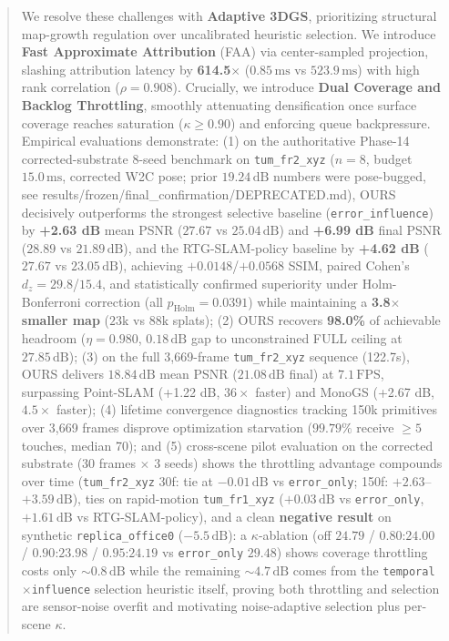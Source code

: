 \documentclass[10pt,twocolumn,letterpaper]{article}
\begin{document}
\begin{abstract}
We resolve these challenges with \textbf{Adaptive 3DGS}, prioritizing structural map-growth regulation over uncalibrated heuristic selection. We introduce \textbf{Fast Approximate Attribution} (FAA) via center-sampled projection, slashing attribution latency by \textbf{614.5$\times$} ($0.85\,\mathrm{ms}$ vs $523.9\,\mathrm{ms}$) with high rank correlation ($\rho = 0.908$). Crucially, we introduce \textbf{Dual Coverage and Backlog Throttling}, smoothly attenuating densification once surface coverage reaches saturation ($\kappa \ge 0.90$) and enforcing queue backpressure.
Empirical evaluations demonstrate:
(1) on the authoritative Phase-14 corrected-substrate 8-seed benchmark on \texttt{tum\_fr2\_xyz} ($n=8$, budget $15.0\,\mathrm{ms}$, corrected W2C pose; prior $19.24\,\mathrm{dB}$ numbers were pose-bugged, see results/frozen/final\_confirmation/DEPRECATED.md), OURS decisively outperforms the strongest selective baseline (\texttt{error\_influence}) by \textbf{+2.63 dB} mean PSNR ($27.67$ vs $25.04\,\mathrm{dB}$) and \textbf{+6.99 dB} final PSNR ($28.89$ vs $21.89\,\mathrm{dB}$), and the RTG-SLAM-policy baseline by \textbf{+4.62 dB} ($27.67$ vs $23.05\,\mathrm{dB}$), achieving $+0.0148$/$+0.0568$ SSIM, paired Cohen's $d_z = \mathbf{29.8}$/$\mathbf{15.4}$, and statistically confirmed superiority under Holm-Bonferroni correction (all $p_{\mathrm{Holm}} = 0.0391$) while maintaining a \textbf{3.8$\times$ smaller map} ($23\mathrm{k}$ vs $88\mathrm{k}$ splats);
(2) OURS recovers \textbf{98.0\%} of achievable headroom ($\eta = 0.980$, $0.18\,\mathrm{dB}$ gap to unconstrained FULL ceiling at $27.85\,\mathrm{dB}$);
(3) on the full 3,669-frame \texttt{tum\_fr2\_xyz} sequence (122.7s), OURS delivers $18.84\,\mathrm{dB}$ mean PSNR ($21.08\,\mathrm{dB}$ final) at $7.1\,\mathrm{FPS}$, surpassing Point-SLAM (+1.22 dB, $36\times$ faster) and MonoGS (+2.67 dB, $4.5\times$ faster);
(4) lifetime convergence diagnostics tracking 150k primitives over 3,669 frames disprove optimization starvation ($99.79\%$ receive $\ge 5$ touches, median 70); and
(5) cross-scene pilot evaluation on the corrected substrate (30 frames $\times$ 3 seeds) shows the throttling advantage compounds over time (\texttt{tum\_fr2\_xyz} 30f: tie at $-0.01\,\mathrm{dB}$ vs \texttt{error\_only}; 150f: $+2.63$--$+3.59\,\mathrm{dB}$), ties on rapid-motion \texttt{tum\_fr1\_xyz} ($+0.03\,\mathrm{dB}$ vs \texttt{error\_only}, $+1.61\,\mathrm{dB}$ vs RTG-SLAM-policy), and a clean \textbf{negative result} on synthetic \texttt{replica\_office0} ($-5.5\,\mathrm{dB}$): a $\kappa$-ablation (off $24.79$ / $0.80$:$24.00$ / $0.90$:$23.98$ / $0.95$:$24.19$ vs \texttt{error\_only} $29.48$) shows coverage throttling costs only $\sim 0.8\,\mathrm{dB}$ while the remaining $\sim 4.7\,\mathrm{dB}$ comes from the \texttt{temporal}$\times$\texttt{influence} selection heuristic itself, proving both throttling and selection are sensor-noise overfit and motivating noise-adaptive selection plus per-scene $\kappa$.
\end{abstract}
\end{document}
